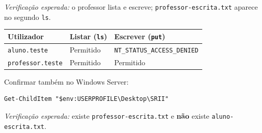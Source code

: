 \emph{Verificação esperada:} o professor lista e escreve; \texttt{professor-escrita.txt} aparece no segundo \texttt{ls}.


\begin{center}\small
\begin{tabularx}{\linewidth}{|>{\raggedright\arraybackslash}X|>{\raggedright\arraybackslash}X|>{\raggedright\arraybackslash}X|}
\hline
\rowcolor{azul!10}\textbf{Utilizador} & \textbf{Listar (\texttt{ls})} & \textbf{Escrever (\texttt{put})} \\
\hline
\texttt{aluno.teste} & Permitido & \texttt{NT\_STATUS\_ACCESS\_DENIED} \\
\hline
\texttt{professor.teste} & Permitido & Permitido \\
\hline
\end{tabularx}
\end{center}

Confirmar também no Windows Server:

\begin{lstlisting}[style=psstyle]
Get-ChildItem "$env:USERPROFILE\Desktop\SRII"
\end{lstlisting}

\emph{Verificação esperada:} existe \texttt{professor-escrita.txt} e \textbf{não} existe \texttt{aluno-escrita.txt}.
